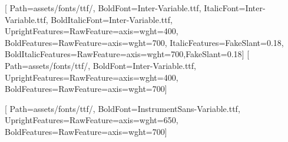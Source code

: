 \usepackage{xcolor}

\setmainfont{Inter-Variable.ttf}[
  Path=assets/fonts/ttf/, BoldFont=Inter-Variable.ttf, ItalicFont=Inter-Variable.ttf, BoldItalicFont=Inter-Variable.ttf,
  UprightFeatures={RawFeature={axis={wght=400}}},
  BoldFeatures={RawFeature={axis={wght=700}}},
  ItalicFeatures={FakeSlant=0.18},
  BoldItalicFeatures={RawFeature={axis={wght=700}},FakeSlant=0.18}]
\setsansfont{Inter-Variable.ttf}[
  Path=assets/fonts/ttf/, BoldFont=Inter-Variable.ttf,
  UprightFeatures={RawFeature={axis={wght=400}}},
  BoldFeatures={RawFeature={axis={wght=700}}}]

\newfontfamily{}[
  Path=assets/fonts/ttf/, BoldFont=InstrumentSans-Variable.ttf,
  UprightFeatures={RawFeature={axis={wght=650}}},
  BoldFeatures={RawFeature={axis={wght=700}}}]

\renewcommand*{\chapterformat}{%
  {\usekomafont{chapterprefix}\chapapp\nobreakspace\thechapter}\\[.35\baselineskip]
  {\color{riplrtcyan}\rule{3em}{2pt}}}
\renewcommand*{\chapterlinesformat}[3]{\@hangfrom{#2}{#3}}

\usepackage[automark,headsepline=.4pt]{scrlayer-scrpage}
\clearpairofpagestyles
\ihead{\headmark}
\ohead{\pagemark}
\pagestyle{scrheadings}

